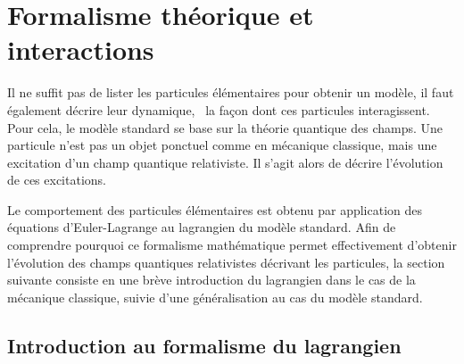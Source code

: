 \section{Formalisme théorique et interactions}\label{chapter-MS-MSSM-section-formalisme}
Il ne suffit pas de lister les particules élémentaires pour obtenir un modèle, il faut également décrire leur dynamique, \ie\ la façon dont ces particules interagissent. 
Pour cela, le modèle standard se base sur la théorie quantique des champs. Une particule n'est pas un \og objet ponctuel \fg{} comme en mécanique classique, mais une excitation d'un champ quantique relativiste. Il s'agit alors de décrire l'évolution de ces excitations.
\par
Le comportement des particules élémentaires est obtenu par application des équations d'Euler-Lagrange au lagrangien du modèle standard.
Afin de comprendre pourquoi ce formalisme mathématique permet effectivement d'obtenir l'évolution des champs quantiques relativistes décrivant les particules, la section suivante consiste en une brève introduction du lagrangien dans le cas de la mécanique classique, suivie d'une généralisation au cas du modèle standard.
\subsection{Introduction au formalisme du lagrangien}\label{chapter-MS-MSSM-section-formalisme-subsec-into_lagrangien}
